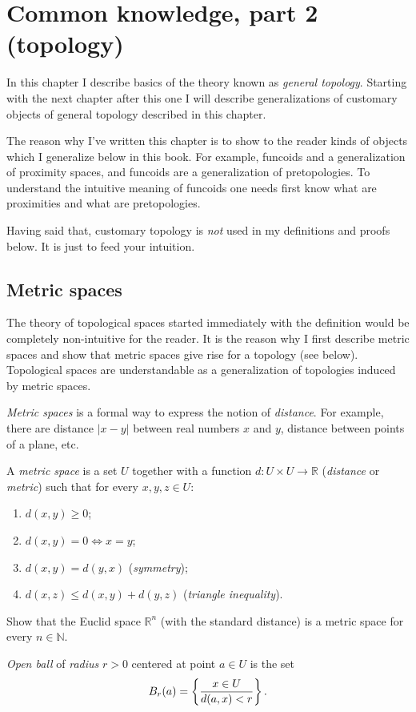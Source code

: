 
\chapter{\label{common-top}Common knowledge, part 2 (topology)}

In this chapter I describe basics of the theory known as \emph{general
topology}. Starting with the next chapter after this one I will describe
generalizations of customary objects of general topology described
in this chapter.

The reason why I've written this chapter is to show to the reader
kinds of objects which I generalize below in this book. For example,
funcoids and a generalization of proximity spaces, and funcoids are
a generalization of pretopologies. To understand the intuitive meaning
of funcoids one needs first know what are proximities and what are
pretopologies.

Having said that, customary topology is \emph{not} used in my definitions
and proofs below. It is just to feed your intuition.


\section{Metric spaces}

The theory of topological spaces started immediately with the definition
would be completely non-intuitive for the reader. It is the reason
why I first describe metric spaces and show that metric spaces give
rise for a topology (see below). Topological spaces are understandable
as a generalization of topologies induced by metric spaces.

\emph{Metric spaces} is a formal way to express the notion of \emph{distance}.
For example, there are distance $|x-y|$ between real numbers $x$
and $y$, distance between points of a plane, etc.
\begin{defn}
A \emph{metric space} is a set
$U$ together with a function $d:U\times U\rightarrow\mathbb{R}$
(\emph{distance} or \emph{metric}) such that for every $x,y,z\in U$:
\begin{enumerate}
\item $d(x,y)\ge0$;
\item $d(x,y)=0\Leftrightarrow x=y$;
\item $d(x,y)=d(y,x)$ (\emph{symmetry});
\item {}$d(x,z)\le d(x,y)+d(y,z)$ (\emph{triangle
inequality}).
\end{enumerate}
\end{defn}
\begin{xca}
Show that the Euclid space $\mathbb{R}^{n}$ (with the standard distance)
is a metric space for every $n\in\mathbb{N}$.\end{xca}
\begin{defn}
\emph{Open ball} of \emph{radius} $r>0$ centered
at point $a\in U$ is the set
\[
B_{r}(a)=\left\{ \frac{x\in U}{d(a,x)<r}\right\}.
\]

\end{defn}

